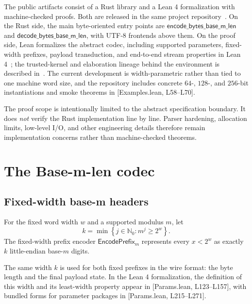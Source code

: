 \documentclass{system-security-article}
\newcommand{\set}[1]{\left\{ #1 \right\}}
\providecommand{\href}[2]{#2}
\newcommand{\EncodePrefixM}{\mathsf{EncodePrefix}_m}
\newcommand{\BaseM}{base-\(m\)}
\newcommand{\LeanParams}[2]{\href{https://github.com/KyrylR/phd-symmetric-cryptography/blob/8e903222a7df1c4365592e4b16fa752a924b8977/lean/encoding-dr-1/EncodingProofs/BaseMLen/Params.lean\#L#1-L#2}{[Params.lean, L#1--L#2]}}
\newcommand{\LeanExamples}[2]{\href{https://github.com/KyrylR/phd-symmetric-cryptography/blob/8e903222a7df1c4365592e4b16fa752a924b8977/lean/encoding-dr-1/EncodingProofs/BaseMLen/Examples.lean\#L#1-L#2}{[Examples.lean, L#1--L#2]}}
\begin{document}
    The public artifacts consist of a Rust library and a Lean 4 formalization with machine-checked proofs.
    Both are released in the same project repository~\cite{riabov2026encodingrepo}.
    On the Rust side, the main byte-oriented entry points are \(\mathsf{encode\_bytes\_base\_m\_len}\) and
    \(\mathsf{decode\_bytes\_base\_m\_len}\), with UTF-8 frontends above them.
    On the proof side, Lean formalizes the abstract codec, including supported parameters, fixed-width prefixes,
    payload transduction, and end-to-end stream properties in Lean 4~\cite{demoura2021lean4};
    the trusted-kernel and elaboration lineage behind the environment is described in~\cite{demoura2015lean}.
    The current development is width-parametric rather than tied to one machine word size, and the repository
    includes concrete \(64\)-, \(128\)-, and \(256\)-bit instantiations and smoke theorems in \LeanExamples{58}{70}.

    The proof scope is intentionally limited to the abstract specification boundary.
    It does \emph{not} verify the Rust implementation line by line.
    Parser hardening, allocation limits, low-level I/O, and other engineering details therefore
    remain implementation concerns rather than machine-checked theorems.

    \section{The Base-m-len codec}
    \label{sec:codec}

    \subsection{Fixed-width base-m headers}
    \label{subsec:prefix}

    \begin{definition}
        \label{def:prefix-width}
        For the fixed word width \(w\) and a supported modulus \(m\), let
        \[
            k = \min \set{j \in \mathbb{N}_0 : m^j \ge 2^{w}}.
        \]
        The fixed-width prefix encoder \(\EncodePrefixM\) represents every \(x < 2^{w}\)
        as exactly \(k\) little-endian \BaseM{} digits.
    \end{definition}

    The same width \(k\) is used for both fixed prefixes in the wire format: the byte length and the final payload state.
    In the Lean 4 formalization, the definition of this width and its least-width property appear in \LeanParams{123}{157},
    with bundled forms for parameter packages in \LeanParams{215}{271}.
\end{document}
